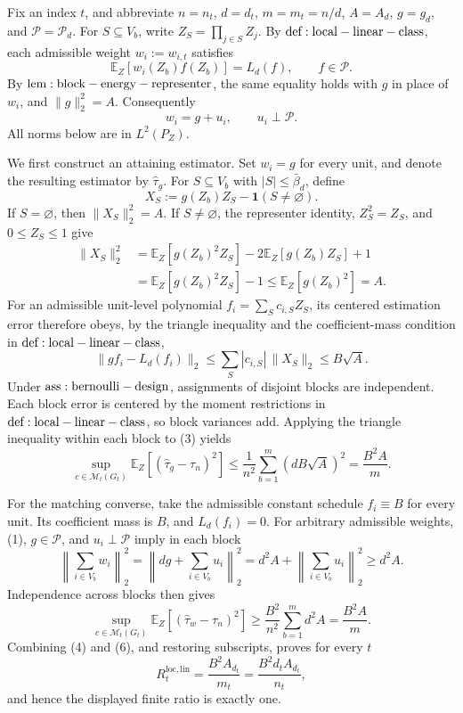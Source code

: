 Fix an index \(t\), and abbreviate \(n=n_t\), \(d=d_t\), \(m=m_t=n/d\), \(A=A_d\), \(g=g_d\), and \(\mathcal P=\mathcal P_d\). For \(S\subseteq V_b\), write \(Z_S=\prod_{j\in S}Z_j\). By \({\rm def:local-linear-class}\), each admissible weight \(w_i:=w_{i,t}\) satisfies
\[
\mathbb E_Z[w_i(Z_b)f(Z_b)]=L_d(f),\qquad f\in\mathcal P.
\]
By \({\rm lem:block-energy-representer}\), the same equality holds with \(g\) in place of \(w_i\), and \(\|g\|_2^2=A\). Consequently
\[
w_i=g+u_i,\qquad u_i\perp\mathcal P.
\tag{1}
\]
All norms below are in \(L^2(P_Z)\).

We first construct an attaining estimator. Set \(w_i=g\) for every unit, and denote the resulting estimator by \(\widehat\tau_g\). For \(S\subseteq V_b\) with \(|S|\le\bar\beta_d\), define
\[
X_S:=g(Z_b)Z_S-\mathbf1(S\ne\varnothing).
\]
If \(S=\varnothing\), then \(\|X_S\|_2^2=A\). If \(S\ne\varnothing\), the representer identity, \(Z_S^2=Z_S\), and \(0\le Z_S\le1\) give
\[
\begin{aligned}
\|X_S\|_2^2
&=\mathbb E_Z[g(Z_b)^2Z_S]-2\mathbb E_Z[g(Z_b)Z_S]+1\\
&=\mathbb E_Z[g(Z_b)^2Z_S]-1
\le \mathbb E_Z[g(Z_b)^2]=A.
\end{aligned}
\tag{2}
\]
For an admissible unit-level polynomial \(f_i=\sum_Sc_{i,S}Z_S\), its centered estimation error therefore obeys, by the triangle inequality and the coefficient-mass condition in \({\rm def:local-linear-class}\),
\[
\|g f_i-L_d(f_i)\|_2
\le\sum_S|c_{i,S}|\,\|X_S\|_2
\le B\sqrt A.
\tag{3}
\]
Under \({\rm ass:bernoulli-design}\), assignments of disjoint blocks are independent. Each block error is centered by the moment restrictions in \({\rm def:local-linear-class}\), so block variances add. Applying the triangle inequality within each block to (3) yields
\[
\sup_{c\in\mathcal M_t(G_t)}
\mathbb E_Z[(\widehat\tau_g-\tau_n)^2]
\le \frac1{n^2}\sum_{b=1}^m(dB\sqrt A)^2
=\frac{B^2A}{m}.
\tag{4}
\]

For the matching converse, take the admissible constant schedule \(f_i\equiv B\) for every unit. Its coefficient mass is \(B\), and \(L_d(f_i)=0\). For arbitrary admissible weights, (1), \(g\in\mathcal P\), and \(u_i\perp\mathcal P\) imply in each block
\[
\left\|\sum_{i\in V_b}w_i\right\|_2^2
=\left\|dg+\sum_{i\in V_b}u_i\right\|_2^2
=d^2A+\left\|\sum_{i\in V_b}u_i\right\|_2^2
\ge d^2A.
\tag{5}
\]
Independence across blocks then gives
\[
\sup_{c\in\mathcal M_t(G_t)}
\mathbb E_Z[(\widehat\tau_w-\tau_n)^2]
\ge\frac{B^2}{n^2}\sum_{b=1}^m d^2A
=\frac{B^2A}{m}.
\tag{6}
\]
Combining (4) and (6), and restoring subscripts, proves for every \(t\)
\[
R_t^{\mathrm{loc,lin}}=\frac{B^2A_{d_t}}{m_t}
=\frac{B^2d_tA_{d_t}}{n_t},
\]
and hence the displayed finite ratio is exactly one.

